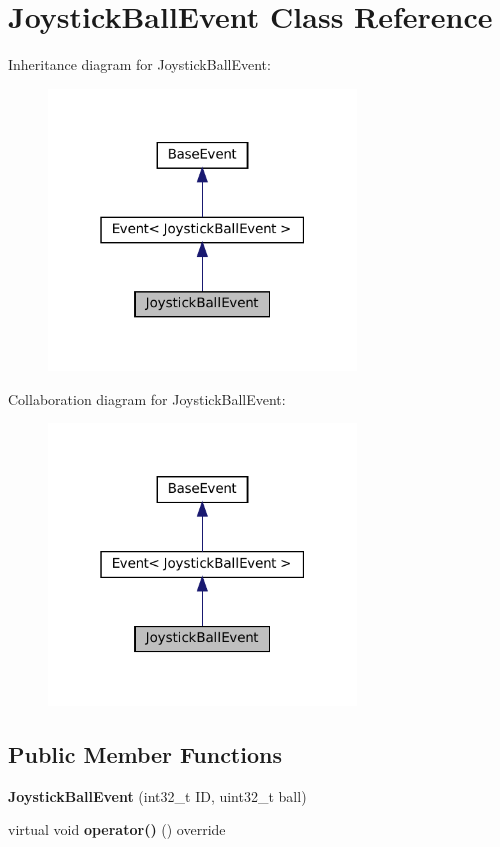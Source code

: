 \hypertarget{classJoystickBallEvent}{}\section{Joystick\+Ball\+Event Class Reference}
\label{classJoystickBallEvent}


Inheritance diagram for Joystick\+Ball\+Event\+:\nopagebreak
\begin{figure}[H]
\begin{center}
\leavevmode
\includegraphics[width=232pt]{classJoystickBallEvent__inherit__graph}
\end{center}
\end{figure}


Collaboration diagram for Joystick\+Ball\+Event\+:\nopagebreak
\begin{figure}[H]
\begin{center}
\leavevmode
\includegraphics[width=232pt]{classJoystickBallEvent__coll__graph}
\end{center}
\end{figure}
\subsection*{Public Member Functions}
\begin{DoxyCompactItemize}
\item 
\mbox{\label{classJoystickBallEvent_afb84efba8ce7de8cefe637465afcb251}} 
{\bfseries Joystick\+Ball\+Event} (int32\+\_\+t ID, uint32\+\_\+t ball)
\item 
\mbox{\label{classJoystickBallEvent_a3b4e40f527acb459af38ca7d1f8bf29e}} 
virtual void {\bfseries operator()} () override
\end{DoxyCompactItemize}
